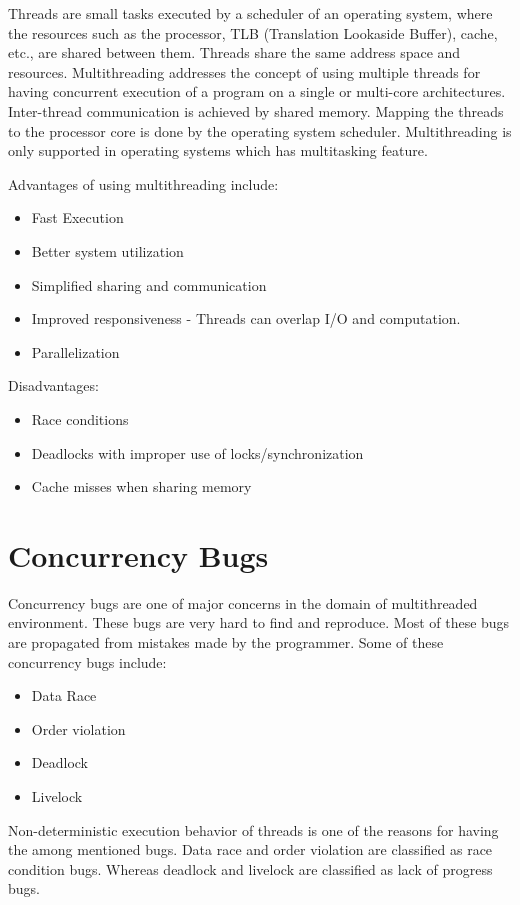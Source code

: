 Threads are small tasks executed by a scheduler of an operating system, where the resources such as the processor, TLB (Translation Lookaside Buffer), cache, etc., are shared between them. 
Threads share the same address space and resources. 
Multithreading addresses the concept of using multiple threads for having concurrent execution of a program on a single or multi-core architectures. 
Inter-thread communication is achieved by shared memory. 
Mapping the threads to the processor core is done by the operating system scheduler. 
Multithreading is only supported in operating systems which has multitasking feature. 

Advantages of using multithreading include: 
\begin{itemize}
\item	Fast Execution
\item	Better system utilization
\item	Simplified sharing  and communication
\item 	Improved responsiveness - Threads can overlap I/O and computation.
\item	Parallelization
\end{itemize}

Disadvantages:
\begin{itemize}
\item	Race conditions
\item	Deadlocks with improper use of locks/synchronization
\item	Cache misses when sharing memory
\end{itemize}

\section{Concurrency Bugs \label{con_bugs}}

Concurrency bugs are one of major concerns in the domain of multithreaded environment. 
These bugs are very hard to find and reproduce. 
Most of these bugs are propagated from mistakes made by the programmer\cite{lopez2017study}. 
Some of these concurrency bugs include:
\begin{itemize}
\item	Data Race
\item 	Order violation
\item	Deadlock
\item	Livelock
\end{itemize}

Non-deterministic execution behavior of threads is one of the reasons for having the among mentioned bugs. 
Data race and order violation are classified as race condition bugs. 
Whereas deadlock and livelock are classified as lack of progress bugs. 

